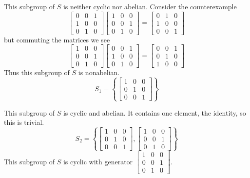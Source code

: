 \documentclass{scrartcl}
\begin{document}
This subgroup of $S$ is neither cyclic nor abelian. Consider the counterexample \begin{displaymath}
\begin{bmatrix}
0 & 0 & 1 \\
1 & 0 & 0 \\
0 & 1 & 0 
\end{bmatrix}\begin{bmatrix}
1 & 0 & 0 \\
0 & 0 & 1 \\
0 & 1 & 0
\end{bmatrix}=\begin{bmatrix}
0 & 1 & 0 \\
1 & 0 & 0 \\
0 & 0 & 1 
\end{bmatrix}\end{displaymath} but commuting the matrices we see \begin{displaymath}\begin{bmatrix}
1 & 0 & 0 \\
0 & 0 & 1 \\
0 & 1 & 0
\end{bmatrix}\begin{bmatrix}
0 & 0 & 1 \\
1 & 0 & 0 \\
0 & 1 & 0
\end{bmatrix}=\begin{bmatrix}
0 & 0 & 1 \\
0 & 1 & 0 \\
1 & 0 & 0
\end{bmatrix}
\end{displaymath} Thus this subgroup of $S$ is nonabelian.\\

\begin{displaymath}
S_1=\left \{
\begin{bmatrix}
1 & 0 & 0 \\
0 & 1 & 0 \\
0 & 0 & 1 
\end{bmatrix}
\right \}
\end{displaymath}

This subgroup of $S$ is cyclic and abelian. It contains one element, the identity, so this is trivial.\\

\begin{displaymath}
S_2=\left \{
\begin{bmatrix}
1 & 0 & 0 \\
0 & 1 & 0 \\
0 & 0 & 1 
\end{bmatrix},\begin{bmatrix}
1 & 0 & 0 \\
0 & 0 & 1 \\
0 & 1 & 0 
\end{bmatrix}
\right \}
\end{displaymath}
This subgroup of $S$ is cyclic with generator $\begin{bmatrix}
1 & 0 & 0 \\
0 & 0 & 1 \\
0 & 1 & 0 
\end{bmatrix}$.\\
\end{document}
